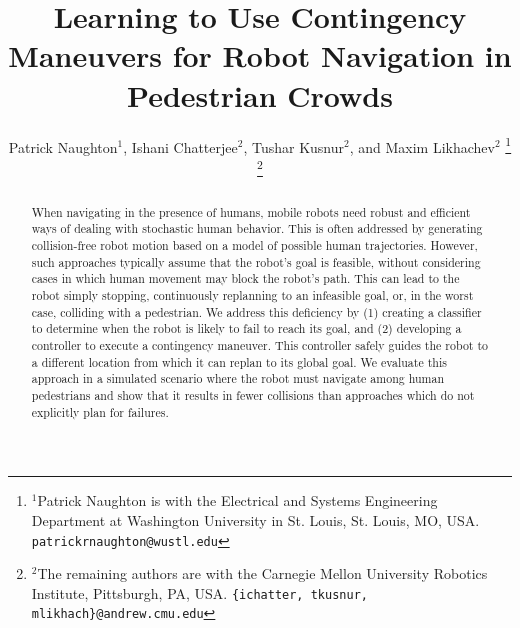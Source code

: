 \documentclass[letterpaper, 10 pt, conference]{ieeeconf}  %
\title{\LARGE \bf
	Learning to Use Contingency Maneuvers for Robot Navigation in Pedestrian Crowds
}
\author{Patrick Naughton$^{1}$, Ishani Chatterjee$^{2}$, Tushar Kusnur$^{2}$, and Maxim Likhachev$^{2}$%
\thanks{$^{1}$Patrick Naughton is with the Electrical and Systems Engineering Department at Washington University in St. Louis, St. Louis, MO, USA. 
        {\tt\small patrickrnaughton@wustl.edu}}%
\thanks{$^{2}$The remaining authors are with the Carnegie Mellon University Robotics Institute, Pittsburgh, PA, USA.
        {\tt\small \{ichatter, tkusnur, mlikhach\}@andrew.cmu.edu}}%
}
\begin{document}
\newcolumntype{Z}{S[
	table-format=1.2,%
	round-mode=places,
	round-precision=2]}


\maketitle
\thispagestyle{empty}
\pagestyle{empty}


\begin{abstract}
	When navigating in the presence of humans, mobile robots need robust and efficient ways of dealing with stochastic human behavior. This is often addressed by generating collision-free robot motion based on a model of possible human trajectories. However, such approaches typically assume that the robot's goal is feasible, without considering cases in which human movement may block the robot's path. This can lead to the robot simply stopping, continuously replanning to an infeasible goal, or, in the worst case, colliding with a pedestrian. We address this deficiency by (1) creating a classifier to determine when the robot is likely to fail to reach its goal, and (2) developing a controller to execute a contingency maneuver. This controller safely guides the robot to a different location from which it can replan to its global goal. We evaluate this approach in a simulated scenario where the robot must navigate among human pedestrians and show that it results in fewer collisions than approaches which do not explicitly plan for failures.
\end{abstract}


\end{document}
